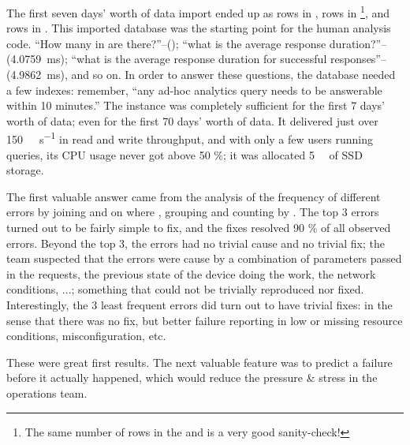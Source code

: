 The first seven days' worth of data import ended up as  rows in ,  rows in \footnote{The same number of rows in the  and  is a very good sanity-check!}, and  rows in . This imported database was the starting point for the human analysis code. ``How many  in  are there?''--(); ``what is the average response duration?''--(\SI{4.0759}{\milli\second}); ``what is the average response duration for successful responses''--(\SI{4.9862}{\milli\second}), and so on. In order to answer these questions, the database needed a few indexes: remember, ``any ad-hoc analytics query needs to be answerable within 10 minutes.'' The  instance was completely sufficient for the first 7 days' worth of data; even for the first 70 days' worth of data. It delivered just over \SI{150}{\mebi\byte\per\second} in read and write throughput, and with only a few users running queries, its CPU usage never got above 50 \%; it was allocated \SI{5}{\tebi\byte} of SSD storage. 

The first valuable answer came from the analysis of the frequency of different errors by joining  and  on  where , grouping and counting by . The top 3 errors turned out to be fairly simple to fix, and the fixes resolved 90 \% of all observed errors. Beyond the top 3, the errors had no trivial cause and no trivial fix; the team suspected that the errors were cause by a combination of parameters passed in the requests, the previous state of the device doing the work, the network conditions, ...; something that could not be trivially reproduced nor fixed. Interestingly, the 3 least frequent errors did turn out to have trivial fixes: in the sense that there was no fix, but better failure reporting in low or missing resource conditions, misconfiguration, etc.

These were great first results. The next valuable feature was to predict a failure before it actually happened, which would reduce the pressure \& stress in the operations team. 


